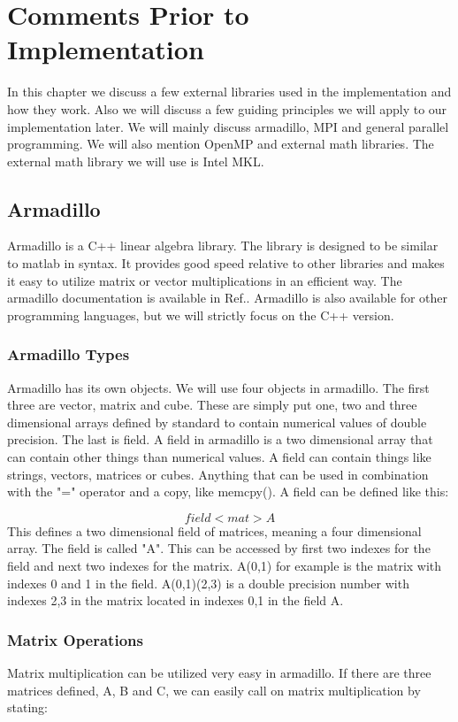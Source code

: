 \documentclass[a4paper,norsk,11pt,twoside]{report}
\begin{document}
\chapter{Comments Prior to Implementation}
In this chapter we discuss a few external libraries used in the implementation and how they work. Also we will discuss a few guiding principles we will apply to our implementation later. We will mainly discuss armadillo, MPI and general parallel programming. We will also mention OpenMP and external math libraries. The external math library we will use is Intel MKL.

\section{Armadillo}
Armadillo is a C++ linear algebra library. The library is designed to be similar to matlab in syntax. It provides good speed relative to other libraries and makes it easy to utilize matrix or vector multiplications in an efficient way. The armadillo documentation is available in Ref.\cite{armadillo-ref1}. Armadillo is also available for other programming languages, but we will strictly focus on the C++ version.

\subsection{Armadillo Types}
Armadillo has its own objects. We will use four objects in armadillo. The first three are vector, matrix and cube. These are simply put one, two and three dimensional arrays defined by standard to contain numerical values of double precision. The last is field. A field in armadillo is a two dimensional array that can contain other things than numerical values. A field can contain things like strings, vectors, matrices or cubes. Anything that can be used in combination with the "=" operator and a copy, like memcpy(). A field can be defined like this:

\begin{equation}
field<mat> A \nonumber
\end{equation}
This defines a two dimensional field of matrices, meaning a four dimensional array. The field is called "A". This can be accessed by first two indexes for the field and next two indexes for the matrix. A(0,1) for example is the matrix with indexes 0 and 1 in the field. A(0,1)(2,3) is a double precision number with indexes 2,3 in the matrix located in indexes 0,1 in the field A.

\subsection{Matrix Operations}
Matrix multiplication can be utilized very easy in armadillo. If there are three matrices defined, A, B and C, we can easily call on matrix multiplication by stating:
\end{document}
